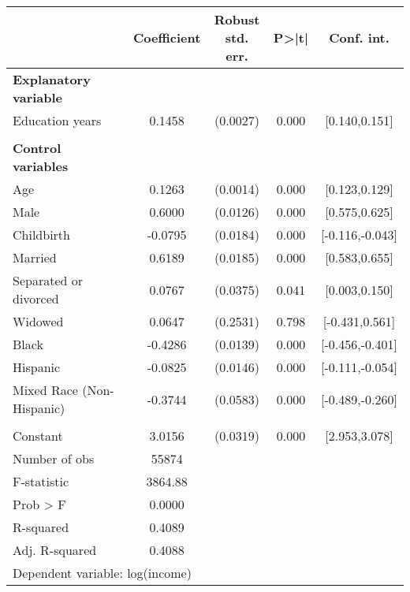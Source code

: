 {
\def\sym#1{\ifmmode^{#1}\else\(^{#1}\)\fi}
\begin{tabular}{l*{1}{cccc}}
\toprule
                    & Coefficient&\shortstack{Robust\\std. err.}&       P>|t|&  Conf. int.\\
\midrule
\textbf{Explanatory variable}&            &            &            &            \\
Education years     &      0.1458&    (0.0027)&       0.000&[0.140,0.151]\\
\\ \textbf{Control variables}&            &            &            &            \\
Age                 &      0.1263&    (0.0014)&       0.000&[0.123,0.129]\\
Male                &      0.6000&    (0.0126)&       0.000&[0.575,0.625]\\
Childbirth          &     -0.0795&    (0.0184)&       0.000&[-0.116,-0.043]\\
Married             &      0.6189&    (0.0185)&       0.000&[0.583,0.655]\\
Separated or divorced&      0.0767&    (0.0375)&       0.041&[0.003,0.150]\\
Widowed             &      0.0647&    (0.2531)&       0.798&[-0.431,0.561]\\
Black               &     -0.4286&    (0.0139)&       0.000&[-0.456,-0.401]\\
Hispanic            &     -0.0825&    (0.0146)&       0.000&[-0.111,-0.054]\\
Mixed Race (Non-Hispanic)&     -0.3744&    (0.0583)&       0.000&[-0.489,-0.260]\\
                    &            &            &            &            \\
Constant            &      3.0156&    (0.0319)&       0.000&[2.953,3.078]\\
\midrule
Number of obs       &       55874&            &            &            \\
F-statistic         &     3864.88&            &            &            \\
Prob > F            &      0.0000&            &            &            \\
R-squared           &      0.4089&            &            &            \\
Adj. R-squared      &      0.4088&            &            &            \\
\bottomrule
\multicolumn{5}{l}{\footnotesize Dependent variable: log(income)}\\
\end{tabular}
}
